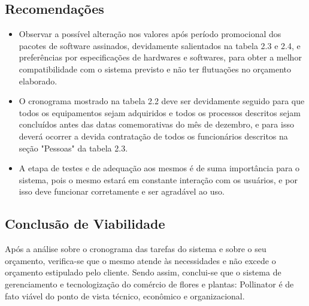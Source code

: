        \subsection{Recomenda\c{c}\~{o}es}
	\begin{itemize}
      \item Observar a possível alteração nos valores após período promocional dos pacotes de software assinados, devidamente salientados na tabela 2.3 e 2.4, e preferências por especificações de hardwares e softwares, para obter a melhor compatibilidade com o sistema previsto e não ter flutuações no orçamento elaborado. 
      \item O cronograma mostrado na tabela 2.2 deve ser devidamente seguido para que todos os equipamentos sejam adquiridos e todos os processos descritos sejam concluídos antes das datas comemorativas do mês de dezembro, e para isso deverá ocorrer a devida contratação de todos os funcionários descritos na seção "Pessoas" da tabela 2.3.
      \item A etapa de testes e de adequação aos mesmos é de suma importância para o sistema, pois o mesmo estará em constante interação com os usuários, e por isso deve funcionar corretamente e ser agradável ao uso.
	\end{itemize}
	\subsection{Conclusão de Viabilidade}
Após a análise sobre o cronograma das tarefas do sistema e sobre o seu orçamento, verifica-se que o mesmo atende às necessidades e não excede o orçamento estipulado pelo cliente. Sendo assim, conclui-se que o sistema de gerenciamento e tecnologização do comércio de flores e plantas: Pollinator é de fato viável do ponto de vista técnico, econômico e organizacional.
